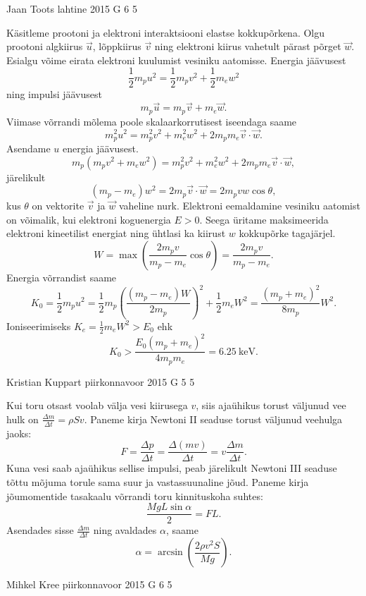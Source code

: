 \documentclass[11pt]{article}
\begin{document}
{%
{Jaan Toots} %
{lahtine} %
{2015} %
{G 6} %
{5} %
{

\ifSolution
Käsitleme prootoni ja elektroni interaktsiooni elastse kokkupõrkena. Olgu prootoni algkiirus $\vec{u}$, lõppkiirus $\vec{v}$ ning elektroni kiirus vahetult pärast põrget $\vec{w}$. Esialgu võime eirata elektroni kuulumist vesiniku aatomisse. Energia jäävusest
\[
\frac{1}{2}m_p u^2 = \frac{1}{2}m_p v^2 + \frac{1}{2}m_e w^2
\]
ning impulsi jäävusest
\[
m_p \vec{u} = m_p \vec{v} + m_e \vec{w}.
\]
Viimase võrrandi mõlema poole skalaarkorrutisest iseendaga saame
\[
m_p^2 u^2 = m_p^2 v^2 + m_e^2 w^2 + 2 m_p m_e \vec{v}\cdot \vec{w}.
\]
Asendame $u$ energia jäävusest.
\[
m_p ( m_p v^2 + m_e w^2 ) = m_p^2 v^2 + m_e^2 w^2 + 2 m_p m_e \vec{v}\cdot \vec{w},
\]
järelikult
\[
( m_p - m_e ) w^2 = 2 m_p \vec{v}\cdot\vec{w} = 2 m_p vw \cos\theta,
\]
kus $\theta$ on vektorite $\vec{v}$ ja $\vec{w}$ vaheline nurk. Elektroni eemaldamine vesiniku aatomist on võimalik, kui elektroni koguenergia $E>0$. Seega üritame maksimeerida elektroni kineetilist energiat ning ühtlasi ka kiirust $w$ kokkupõrke tagajärjel.
\[
W = \max\left(\frac{2 m_p v}{m_p - m_e}\cos\theta\right) = \frac{2 m_p v}{m_p - m_e}.
\]
Energia võrrandist saame
\[
K_0 = \frac{1}{2}m_p u^2 = \frac{1}{2}m_p \left(\frac{( m_p - m_e ) W}{2 m_p}\right)^2 + \frac{1}{2}m_e W^2 = \frac{(m_p + m_e)^2}{8 m_p} W^2.
\]
Ioniseerimiseks $K_e = \frac{1}{2}m_e W^2 > E_0$ ehk
\[
K_0 > \frac{E_0 (m_p + m_e)^2}{4 m_p m_e} = \SI{6.25}{\kilo\electronvolt}.
\]
\fi
}

{Kristian Kuppart} %
{piirkonnavoor} %
{2015} %
{G 5} %
{5} %
{

\ifSolution
Kui toru otsast voolab välja vesi kiirusega $v$, siis ajaühikus torust väljunud vee hulk on $\frac{\Delta m}{\Delta t}=\rho S v$. Paneme kirja Newtoni II seaduse torust väljunud veehulga jaoks: 
\[ F=\frac{\Delta p}{\Delta t}=\frac{\Delta(mv)}{\Delta t}=v \frac{\Delta m}{\Delta t}. \]
Kuna vesi saab ajaühikus sellise impulsi, peab järelikult Newtoni III seaduse tõttu mõjuma torule sama suur ja vastassuunaline jõud. Paneme kirja jõumomentide tasakaalu võrrandi toru kinnituskoha suhtes: 
\[ \frac{MgL\sin \alpha}{2}=FL. \]
Asendades sisse $\frac{\Delta m}{\Delta t}$ ning avaldades $\alpha$, saame
\[ \alpha=\arcsin \left(\frac{2\rho v^2 S}{Mg}\right). \]
\fi
}

{Mihkel Kree} %
{piirkonnavoor} %
{2015} %
{G 6} %
{5} %
{

}}
\end{document}
